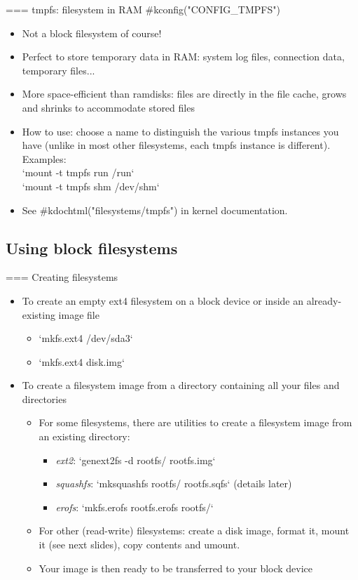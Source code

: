 === tmpfs: filesystem in RAM
  #kconfig("CONFIG_TMPFS")
  \begin{itemize}
  \item Not a block filesystem of course!
  \item Perfect to store temporary data in RAM: system log files,
    connection data, temporary files...
  \item More space-efficient than ramdisks: files are directly in the
    file cache, grows and shrinks to accommodate stored files
  \item How to use: choose a name to distinguish the various tmpfs
    instances you have (unlike in most other filesystems, each
    tmpfs instance is different). Examples:\\
    `mount -t tmpfs run /run`\\
    `mount -t tmpfs shm /dev/shm`
  \item See #kdochtml("filesystems/tmpfs") in kernel documentation.
  \end{itemize}


\subsection{Using block filesystems}

=== Creating filesystems
  \begin{itemize}
  \item To create an empty ext4 filesystem on a block device or
    inside an already-existing image file
    \begin{itemize}
    \item `mkfs.ext4 /dev/sda3`
    \item `mkfs.ext4 disk.img`
    \end{itemize}
  \item To create a filesystem image from a directory containing all
    your files and directories
    \begin{itemize}
    \item For some filesystems, there are utilities to create a
          filesystem image from an existing directory:
          \begin{itemize}
          \item {\em ext2}: `genext2fs -d rootfs/ rootfs.img`
	      \item {\em squashfs}: `mksquashfs rootfs/ rootfs.sqfs` (details later)
          \item {\em erofs}: `mkfs.erofs rootfs.erofs rootfs/`
          \end{itemize}
    \item For other (read-write) filesystems: create a disk image,
          format it, mount it (see next slides), copy contents and umount.
    \item Your image is then ready to be transferred to your block device
    \end{itemize}
  \end{itemize}


